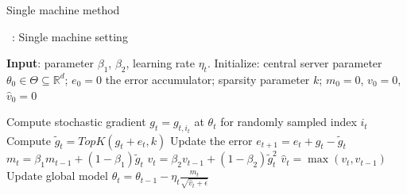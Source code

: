 \documentclass[11pt]{article}
\begin{document}
Single machine method

\begin{algorithm}[H]
\caption{\algo\ : Single machine setting} \label{alg:sparsamssingle}
\begin{algorithmic}[1]

\STATE \textbf{Input}: parameter $\beta_1$, $\beta_2$, learning rate $\eta_t$. 
\STATE Initialize: central server parameter $\theta_{0} \in \Theta \subseteq \mathbb R^d$; $e_{0}=0$ the error accumulator; sparsity parameter $k$; $m_0=0$, $v_0=0$, $\hat v_0=0$

\STATE  Compute stochastic gradient $g_{t} = g_{t,i_t}$ at $\theta_t$ for randomly sampled index $i_t$
\STATE  Compute $\tilde g_{t}=TopK(g_{t}+e_{t},k)$ \label{line:topksingle} 
\STATE  Update the error $e_{t+1}=e_{t}+g_{t}-\tilde g_{t}$
\STATE $m_t=\beta_1 m_{t-1}+(1-\beta_1)\tilde g_t$
\STATE $v_t=\beta_2 v_{t-1}+(1-\beta_2)\tilde g_t^2$
\STATE $\hat v_t=\max(v_t,\hat v_{t-1})$ \label{line:vsingle}
\STATE Update global model $\theta_t=\theta_{t-1}-\eta_t\frac{m_t}{\sqrt{\hat v_t+\epsilon}}$

\ENDFOR
\end{algorithmic}
\end{algorithm}
\end{document}
